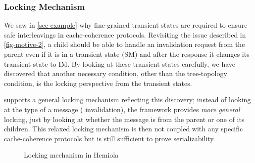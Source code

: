 \documentclass[sigplan,10pt,review,anonymous,screen]{acmart}\settopmatter{printfolios=true,printccs=false,printacmref=false}
\begin{document}
\subsubsection{Locking Mechanism}
\label{sec-locking-mechanism}

We saw in \autoref{sec-example} why fine-grained transient states are required to ensure safe interleavings in cache-coherence protocols.
Revisiting the issue described in \autoref{fig-motive-2}, a child should be able to handle an invalidation request from the parent even if it is in a transient state (SM) and after the response it changes its transient state to IM.
By looking at these transient states carefully, we have discovered that another necessary condition, other than the tree-topology condition, is the locking perspective from the transient states.

\hemiola{} supports a general locking mechanism reflecting this discovery;
instead of looking at the type of a message (\eg{} invalidation), the framework provides \emph{more general} locking, just by looking at whether the message is from the parent or one of its children.
This relaxed locking mechanism is then not coupled with any specific cache-coherence protocols but is still sufficient to prove serializability.

\begin{figure}[h]
  \caption{Locking mechanism in Hemiola}
  \label{fig-locking}
\end{figure}
\end{document}
